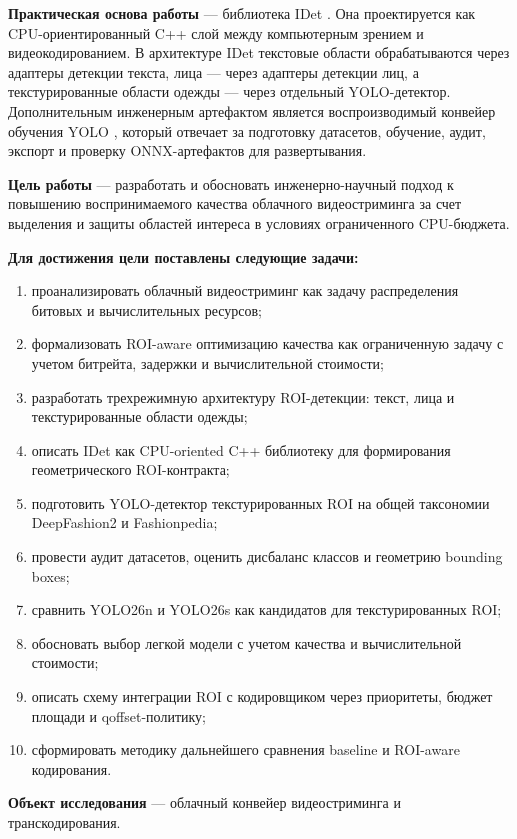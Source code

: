 \documentclass[12pt,a4paper,oneside,openany]{report}
\newcommand{\important}[1]{\textbf{#1}}
\begin{document}
\important{Практическая основа работы} --- библиотека IDet \cite{idet}. Она проектируется как CPU-ориентированный C++ слой между компьютерным зрением и видеокодированием. В архитектуре IDet текстовые области обрабатываются через адаптеры детекции текста, лица --- через адаптеры детекции лиц, а текстурированные области одежды --- через отдельный YOLO-детектор. Дополнительным инженерным артефактом является воспроизводимый конвейер обучения YOLO \cite{pipeline}, который отвечает за подготовку датасетов, обучение, аудит, экспорт и проверку ONNX-артефактов для развертывания.

\important{Цель работы} --- разработать и обосновать инженерно-научный подход к повышению воспринимаемого качества облачного видеостриминга за счет выделения и защиты областей интереса в условиях ограниченного CPU-бюджета.

\vspace{0.5em}

\noindent\important{Для достижения цели поставлены следующие задачи:}
\begin{enumerate}[label=\arabic*)]
\item проанализировать облачный видеостриминг как задачу распределения битовых и вычислительных ресурсов;
\item формализовать ROI-aware оптимизацию качества как ограниченную задачу с учетом битрейта, задержки и вычислительной стоимости;
\item разработать трехрежимную архитектуру ROI-детекции: текст, лица и текстурированные области одежды;
\item описать IDet как CPU-oriented C++ библиотеку для формирования геометрического ROI-контракта;
\item подготовить YOLO-детектор текстурированных ROI на общей таксономии DeepFashion2 и Fashionpedia;
\item провести аудит датасетов, оценить дисбаланс классов и геометрию bounding boxes;
\item сравнить YOLO26n и YOLO26s как кандидатов для текстурированных ROI;
\item обосновать выбор легкой модели с учетом качества и вычислительной стоимости;
\item описать схему интеграции ROI с кодировщиком через приоритеты, бюджет площади и qoffset-политику;
\item сформировать методику дальнейшего сравнения baseline и ROI-aware кодирования.
\end{enumerate}

\important{Объект исследования} --- облачный конвейер видеостриминга и транскодирования.
\end{document}
